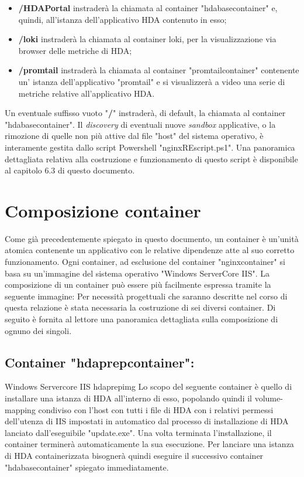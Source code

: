 \begin{itemize}
	\item \textbf{/HDAPortal} instraderà la chiamata al container "hdabasecontainer" e, quindi, all'istanza dell'applicativo HDA contenuto in esso;
	\item \textbf{/loki} instraderà la chiamata al container loki, per la visualizzazione via browser delle metriche di HDA;
	\item \textbf{/promtail} instraderà la chiamata al container "promtailcontainer" contenente un' istanza dell'applicativo "promtail" e si visualizzerà a video una serie di metriche relative all'applicativo HDA.
\end{itemize}
Un eventuale suffisso vuoto "\textbf{/}" instraderà, di default, la chiamata al container "hdabasecontainer".
Il \textit{discovery} di eventuali nuove \textit{sandbox} applicative, o la rimozione di quelle non più attive dal file "host" del sistema operativo, è interamente gestita dallo script Powershell "nginxREscript.ps1". Una panoramica dettagliata relativa alla costruzione e funzionamento di questo script è disponibile al capitolo 6.3 di questo documento.

\section{Composizione container}
Come già precedentemente spiegato in questo documento, un container è un'unità atomica contenente un applicativo con le relative dipendenze atte al suo corretto funzionamento. Ogni container, ad esclusione del container "nginxcontainer" si basa su un'immagine del sistema operativo "Windows ServerCore IIS".
La composizione di un container può essere più facilmente espressa tramite la seguente immagine:
Per necessità progettuali che saranno descritte nel corso di questa relazione è stata necessaria la costruzione di sei diversi container. Di seguito è fornita al lettore una panoramica dettagliata sulla composizione di ognuno dei singoli.\\

\subsection{Container "hdaprepcontainer":}

\begin{namespacedesc}
	 {Windows Servercore IIS}
	 {hdaprepimg}
	 {Lo scopo del seguente container è quello di installare una istanza di HDA all'interno di esso, popolando quindi il volume-mapping condiviso con l'host con tutti i file di HDA con i relativi permessi dell'utenza di IIS impostati in automatico dal processo di installazione di HDA lanciato dall'eseguibile "update.exe".
Una volta terminata l'installazione, il container terminerà automaticamente la sua esecuzione. Per lanciare una istanza di HDA containerizzata bisognerà quindi eseguire il successivo container "hdabasecontainer" spiegato immediatamente.}
\end{namespacedesc}
